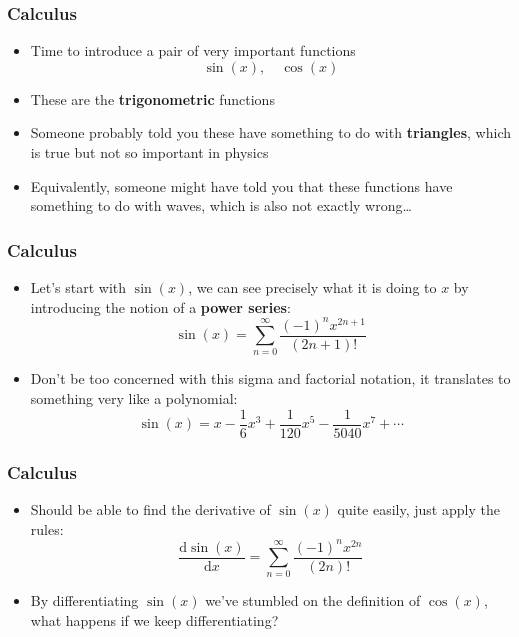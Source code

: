 \documentclass{beamer}
\begin{document}
\begin{frame}
  \frametitle{Calculus}
  \begin{itemize}
    \item<1-> Time to introduce a pair of very important functions
      \begin{equation*}
	\sin(x), \quad \cos(x)
      \end{equation*}
    \item<2-> These are the \textbf{trigonometric} functions
    \item<3-> Someone probably told you these have something to do with \textbf{triangles}, which is true but not so important in physics
    \item<4-> Equivalently, someone might have told you that these functions have something to do with waves, which is also not exactly wrong\ldots
  \end{itemize}
\end{frame}

\begin{frame}
  \frametitle{Calculus}
  \begin{itemize}
    \item<1-> Let's start with $\sin(x)$, we can see precisely what it is doing to $x$ by introducing the notion of a \textbf{power series}:
      \begin{equation*}
	\sin(x)=\sum_{n=0}^{\infty}\frac{(-1)^nx^{2n+1}}{(2n+1)!}
      \end{equation*}
    \item<2-> Don't be too concerned with this sigma and factorial notation, it translates to something very like a polynomial:
      \begin{equation*}
	\sin(x)=x-\frac{1}{6}x^3+\frac{1}{120}x^5-\frac{1}{5040}x^7+\cdots
	\label{<+label+>}
      \end{equation*}
    \end{itemize}
\end{frame}

\begin{frame}
  \frametitle{Calculus}
  \begin{itemize}
    \item<1-> Should be able to find the derivative of $\sin(x)$ quite easily, just apply the rules:
      \begin{equation*}
	\frac{\mathrm{d}\sin(x)}{\mathrm{d}x}=\sum_{n=0}^{\infty}\frac{(-1)^nx^{2n}}{(2n)!}
	\label{<+label+>}
      \end{equation*}
    \item<2-> By differentiating $\sin(x)$ we've stumbled on the definition of $\cos(x)$, what happens if we keep differentiating?
  \end{itemize}
\end{frame}
\end{document}
